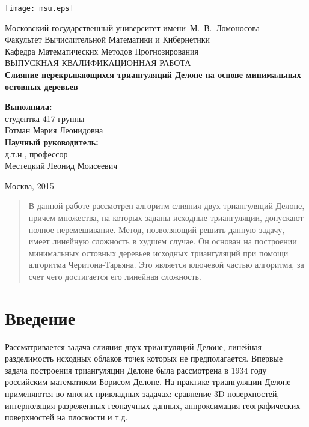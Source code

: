 \documentclass[12pt]{article}
\begin{document}
\begin{titlepage}
\begin{center}

	\texttt{[image: msu.eps]}
	
	\bigskip

	Московский государственный университет имени~М.~В.~Ломоносова\\
	Факультет Вычислительной Математики и Кибернетики\\
	Кафедра Математических Методов Прогнозирования\\[30mm]

	\textsf{\large
      ВЫПУСКНАЯ КВАЛИФИКАЦИОННАЯ РАБОТА\\[10mm]
      \textbf{
        Слияние перекрывающихся триангуляций Делоне на основе минимальных остовных деревьев
      }
    }\\[30mm]
	
	\begin{flushright}
      \parbox{0.5\textwidth}{
        \raggedleft
        \textbf{Выполнила:}\\
        студентка 417 группы\\
        Готман Мария Леонидовна\\[5mm]
        \textbf{Научный руководитель:}\\
        д.т.н., профессор\\
        Местецкий Леонид Моисеевич
      }
    \end{flushright}	
	
	\vspace{\fill}
	Москва, 2015
\end{center}
\end{titlepage}

\newpage

\tableofcontents

\newpage
\begin{abstract}
В данной работе рассмотрен алгоритм слияния двух триангуляций Делоне,
причем множества, на которых заданы исходные триангуляции, допускают полное перемешивание.
Метод, позволяющий решить данную задачу, имеет линейную сложность в худшем случае.
Он основан на построении минимальных остовных деревьев исходных триангуляций
при помощи алгоритма Черитона-Тарьяна.
Это является ключевой частью алгоритма, за счет чего достигается его линейная сложность.
\end{abstract}

\newpage
\section{Введение}
Рассматривается задача слияния двух триангуляций Делоне, линейная разделимость исходных облаков точек которых не предполагается.
Впервые задача построения триангуляции Делоне была рассмотрена в 1934 году российским математиком Борисом Делоне.
На практике триангуляции Делоне применяются во многих прикладных задачах:
сравнение 3D поверхностей, интерполяция разреженных геонаучных данных,
аппроксимация географических поверхностей на плоскости и т.д.
\end{document}
